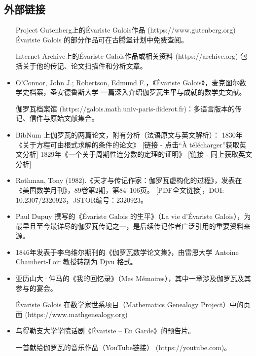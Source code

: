 \subsection{外部链接}
\begin{itemize}
\item [Project Gutenberg上的Évariste Galois作品](https://www.gutenberg.org)
  Évariste Galois 的部分作品可在古腾堡计划中免费查阅。
\item [Internet Archive上的Évariste Galois作品或相关资料](https://archive.org)
  包括关于他的传记、论文扫描件和分析文章。
\item O'Connor, John J.; Robertson, Edmund F.，《Évariste Galois》，麦克图尔数学史档案，圣安德鲁斯大学
  一篇深入介绍伽罗瓦生平与成就的数学史文献。
\item [伽罗瓦档案馆](https://galois.math.univ-paris-diderot.fr)：多语言版本的传记、信件与原始文献集合。
\item BibNum 上伽罗瓦的两篇论文，附有分析（法语原文与英文解析）：
  1830年《关于方程可由根式求解的条件的论文》
    [链接 - 点击“À télécharger”获取英文分析]
  1829年《一个关于周期性连分数的定理的证明》
    [链接 - 同上获取英文分析]
\item Rothman, Tony (1982).《天才与传记作家：伽罗瓦虚构化的过程》，发表在《美国数学月刊》，89卷第2期，第84–106页。
  [PDF全文链接]，DOI: 10.2307/2320923，JSTOR编号：2320923。
\item Paul Dupuy 撰写的《Évariste Galois 的生平》（La vie d'Évariste Galois），为最早且至今最详尽的伽罗瓦传记之一，是后续传记作者广泛引用的重要资料来源。
\item 1846年发表于李乌维尔期刊的《伽罗瓦数学论文集》，由雷恩大学 Antoine Chambert-Loir 教授转制为 Djvu 格式。
\item 亚历山大·仲马的《我的回忆录》（Mes Mémoires），其中一章涉及伽罗瓦及其参与的宴会。
\item [Évariste Galois 在数学家世系项目（Mathematics Genealogy Project）中的页面](https://www.mathgenealogy.org)
\item 乌得勒支大学学院话剧《Évariste – En Garde》的预告片。
\item [一首献给伽罗瓦的音乐作品（YouTube链接）](https://youtube.com)。
\end{itemize}
